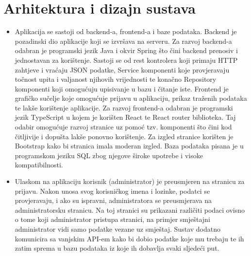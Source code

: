 \chapter{Arhitektura i dizajn sustava}
		

	\begin{itemize}
		\item 	%
		Aplikacija se sastoji od backend-a, frontend-a i baze podataka. \newline Backend je pozadinski dio aplikacije koji se izvršava na serveru. Za razvoj backend-a odabran je programski jezik Java i okvir Spring što čini backend prenosiv i jednostavan za korištenje. Sastoji se od rest kontrolera koji primaju HTTP zahtjeve i vraćaju JSON podatke, Service komponenti koje provjeravaju točnost upita i valjanost njihovih vrijednosti te konačno Repository komponenti koji omogućuju upisivanje u bazu i čitanje iste. \newline Frontend je grafičko sučelje koje omogućuje prijavu u aplikaciju, prikaz traženih podataka te lakše korištenje aplikacije. Za razvoj frontend-a odabran je programski jezik TypeScript u kojem je korišten React te React router biblioteka. Taj odabir omogućuje razvoj stranice uz pomoć tzv. komponenti što čini kod čitljivije i dopušta lakše ponovno korištenje. Za izgled stranice korišten je Bootstrap kako bi stranica imala moderan izgled. \newline Baza podataka pisana je u programskom jeziku SQL zbog njegove široke upotrebe i visoke kompatibilnosti.
		\item	%
		Ulaskom na aplikaciju korisnik (administrator) je preusmjeren na stranicu za prijavu. Nakon unosa svog korisničkog imena i lozinke, podatci se provjeravaju, i ako su ispravni, administratora se  preusmjerava na administratorsku stranicu. Na toj stranici su prikazani različiti podaci ovisno o tome koji administrator pristupa stranici, na primjer smještajni administrator vidi samo podatke vezane uz smještaj. \newline Sustav dodatno komunicira sa vanjskim API-em kako bi dobio podatke koje mu trebaju te ih zatim sprema u bazu podataka iz koje ih dobavlja svaki sljedeći put. 

\end{itemize}

